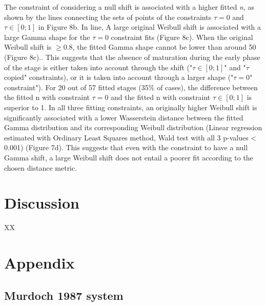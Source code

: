 \documentclass[12pt,a4paper,onecolumn]{article}
\newcommand{\noPageNumber}{\thispagestyle{empty}}
\begin{document}
\tabto{1 cm} The constraint of considering a null shift is associated with a higher fitted \textit{n}, as shown by the lines connecting the sets of points of the constraints $\tau = 0$ and $\tau \in [0;1]$ in Figure 8b. In line, A large original Weibull shift is associated with a large Gamma shape for the $\tau = 0$ constraint fits (Figure 8c). When the original Weibull shift is $\geq 0.8$, the fitted Gamma shape cannot be lower than around 50 (Figure 8c).. This suggests that the absence of maturation during the early phase of the stage is either taken into account through the shift ("$\tau \in [0;1]$" and "$\tau$ copied" constraints), or it is taken into account through a larger shape ("$\tau = 0$" constraint"). For 20 out of 57 fitted stages (35\% of cases), the difference between the fitted n with constraint $\tau = 0$ and the fitted n with constraint $\tau \in [0;1]$ is superior to 1. In all three fitting constraints, an originally higher Weibull shift is significantly associated with a lower Wasserstein distance between the fitted Gamma distribution and its corresponding Weibull distribution (Linear regression estimated with Ordinary Least Squares method, Wald test with all 3 p-values < 0.001) (Figure 7d). This suggests that even with the constraint to have a null Gamma shift, a large Weibull shift does not entail a poorer fit according to the chosen distance metric.














\section{Discussion}

XX





\printbibliography[heading=bibintoc, keyword={main}, title={References}]

\newpage
\noPageNumber
\appendix
\section{Appendix}
\setcounter{equation}{0}

\subsection{Murdoch 1987 system}
\end{document}
